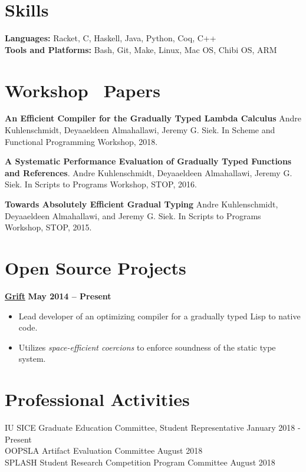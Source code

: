 \documentclass[resmargin,line]{res}
\begin{document}
\begin{resume}

\section{\sc Skills}
{\bf Languages:} Racket, C, Haskell, Java, Python, Coq, C++\\
{\bf Tools and Platforms:} Bash, Git, Make, Linux, Mac OS, Chibi OS, ARM

\section{\sc Workshop \, Papers}

{\bf An Efficient Compiler for the Gradually Typed Lambda Calculus}
Andre Kuhlenschmidt, Deyaaeldeen Almahallawi, Jeremy G. Siek.
In Scheme and Functional Programming Workshop, 2018.

{\bf A Systematic Performance Evaluation of Gradually Typed Functions
  and References}.
%
Andre Kuhlenschmidt, Deyaaeldeen Almahallawi, Jeremy G. Siek.
%
In Scripts to Programs Workshop, STOP, 2016.

{\bf Towards Absolutely Efficient Gradual Typing}
%
Andre Kuhlenschmidt, Deyaaeldeen Almahallawi, and Jeremy G. Siek.
%
In Scripts to Programs Workshop, STOP, 2015.

\section{\sc Open Source Projects}

{\bf \href{github.com/Gradual-Typing/Grift/}{Grift}}
\hfill {\bf May 2014 -- Present}\\
\vspace*{-.35cm}
\begin{itemize}
\item Lead developer of an optimizing compiler for a gradually typed Lisp to
  native code.
\item Utilizes {\em space-efficient coercions} to enforce
  soundness of the static type system.
\end{itemize}


\section{\sc Professional Activities}

IU SICE Graduate Education Committee, Student Representative
\hfill January 2018 - Present \\
OOPSLA Artifact Evaluation Committee \hfill August 2018\\
SPLASH Student Research Competition Program Committee \hfill August 2018\\

\end{resume}
\end{document}
